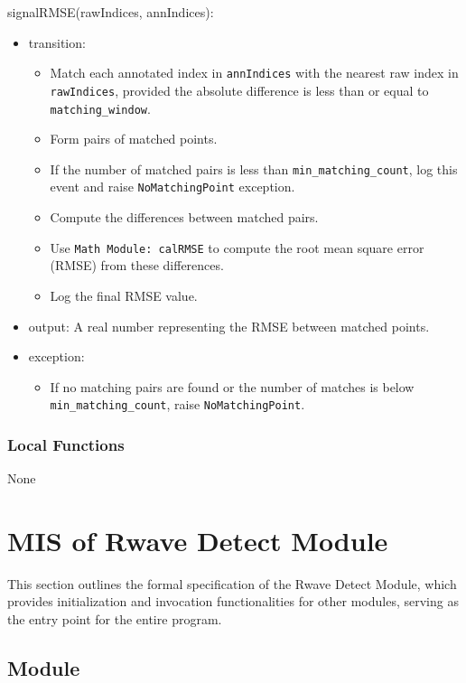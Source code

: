 \documentclass[12pt, titlepage]{article}
\begin{document}
\noindent signalRMSE(rawIndices, annIndices):
\begin{itemize}
\item transition:
    \begin{itemize}
    \item Match each annotated index in \texttt{annIndices} with the nearest raw
    index in \texttt{rawIndices}, provided the absolute difference is less than
    or equal to \texttt{matching\_window}.
    \item Form pairs of matched points.
    \item If the number of matched pairs is less than
    \texttt{min\_matching\_count}, log this event and raise
    \texttt{NoMatchingPoint} exception.
    \item Compute the differences between matched pairs.
    \item Use \texttt{Math Module: calRMSE} to compute the root mean square
    error (RMSE) from these differences.
    \item Log the final RMSE value.
    \end{itemize}
\item output: A real number representing the RMSE between matched points.
\item exception:
    \begin{itemize}
    \item If no matching pairs are found or the number of matches is below
    \texttt{min\_matching\_count}, raise \texttt{NoMatchingPoint}.
    \end{itemize}
\end{itemize}

\subsubsection{Local Functions}

None

\newpage

\section{MIS of Rwave Detect Module} \label{MIS_Rwave}

This section outlines the formal specification of the Rwave Detect Module, which
provides initialization and invocation functionalities for other modules,
serving as the entry point for the entire program.

\subsection{Module}
\end{document}
